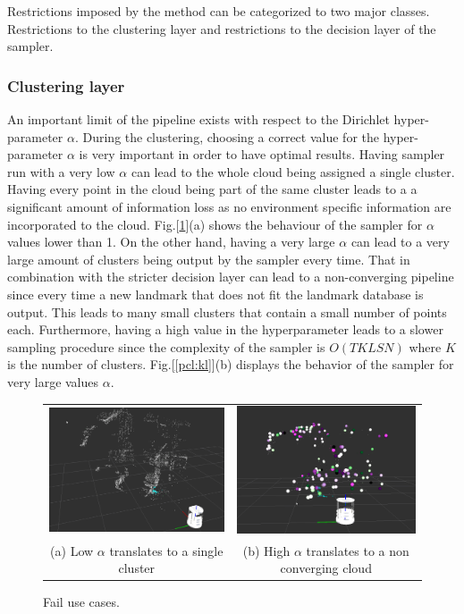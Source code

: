 \documentclass[twoside,hidelinks]{article}
\begin{document}
	Restrictions imposed by the method can be categorized to two major classes. Restrictions to the clustering layer and restrictions to the decision layer of the sampler.


\subsubsection{Clustering layer}


An important limit of the pipeline exists with respect to the Dirichlet hyper-parameter $\alpha$. During the clustering, choosing a correct value for the hyper-parameter $\alpha$ is very important in order to have optimal results. Having sampler run with a very low $\alpha$ can lead to the whole cloud being assigned a single cluster. Having every point in the cloud being part of the same cluster leads to a a significant amount of information loss as no environment specific information are incorporated to the cloud. Fig.[\ref{pip:limits}](a) shows the behaviour of the sampler for $\alpha$ values lower than 1. On the other hand, having a very large $\alpha$ can lead to a very large amount of clusters being output by the sampler every time. That in combination with the stricter decision layer can lead to a non-converging pipeline since every time a new landmark that does not fit the landmark database is output. This leads to many small clusters that contain a small number of points each. Furthermore, having a high value in the hyperparameter leads to a slower sampling procedure since the complexity of the sampler is $O(TKLSN)$ where $K$ is the number of clusters. Fig.[\ref{pcl:kl}](b) displays the behavior of the sampler for very large values $\alpha$.


\begin{figure}
\begin{tabular}{cc}
    \includegraphics[width=.5\textwidth]{singlecluster} &  \includegraphics[width=.5\textwidth]{onlyclusters2} \\
  (a) Low $\alpha$ translates to a single cluster  & (b) High $\alpha$ translates to a non converging cloud \\[6pt]
\end{tabular}
\caption{Fail use cases.}
  \label{pip:limits}
\end{figure}
\end{document}
